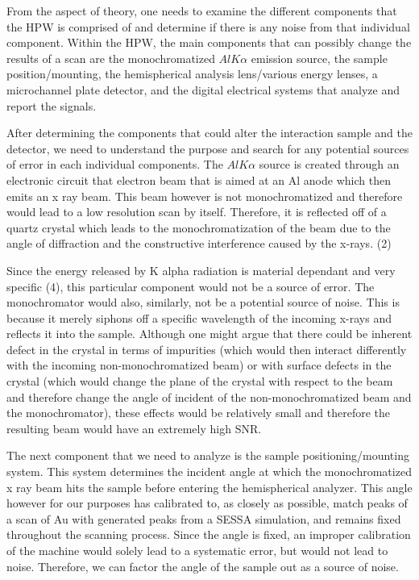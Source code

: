 \documentclass[twoside]{article}
\begin{document}
\begin{multicols}{2}
\vspace{5mm}


From the aspect of theory, one needs to examine the different components that the HPW is comprised of and determine if there is any noise from that individual component.  Within the HPW, the main components that can possibly change the results of a scan are the monochromatized $AlK\alpha$ emission source, the sample position/mounting, the hemispherical analysis lens/various energy lenses, a microchannel plate detector, and the digital electrical systems that analyze and report the signals.


\vspace{5mm} 


After determining the components that could alter the interaction sample and the detector, we need to understand the purpose and search for any potential sources of error in each individual components.  The $AlK\alpha$ source is created through an electronic circuit that electron beam that is aimed at an Al anode which then emits an x ray beam.  This beam however is not monochromatized and therefore would lead to a low resolution scan by itself.  Therefore, it is reflected off of a quartz crystal which leads to the monochromatization of the beam due to the angle of diffraction and the constructive interference caused by the x-rays. (2)


\vspace{5mm}


Since the energy released by K alpha radiation is material dependant and very specific (4), this particular component would not be a source of error.  The monochromator would also, similarly, not be a potential source of noise.  This is because it merely siphons off a specific wavelength of the incoming x-rays and reflects it into the sample.  Although one might argue that there could be inherent defect in the crystal in terms of impurities (which would then interact differently with the incoming non-monochromatized beam) or with surface defects in the crystal (which would change the plane of the crystal with respect to the beam and therefore change the angle of incident of the non-monochromatized beam and the monochromator), these effects would be relatively small and therefore the resulting beam would have an extremely high SNR.


\vspace{5mm}


The next component that we need to analyze is the sample positioning/mounting system.  This system determines the incident angle at which the monochromatized x ray beam hits the sample before entering the hemispherical analyzer.  This angle however for our purposes has calibrated to, as closely as possible, match peaks of a scan of Au with generated peaks from a SESSA simulation, and remains fixed throughout the scanning process.  Since the angle is fixed, an improper calibration of the machine would solely lead to a systematic error, but would not lead to noise. Therefore, we can factor the angle of the sample out as a source of noise.  



\end{multicols}
\end{document}
